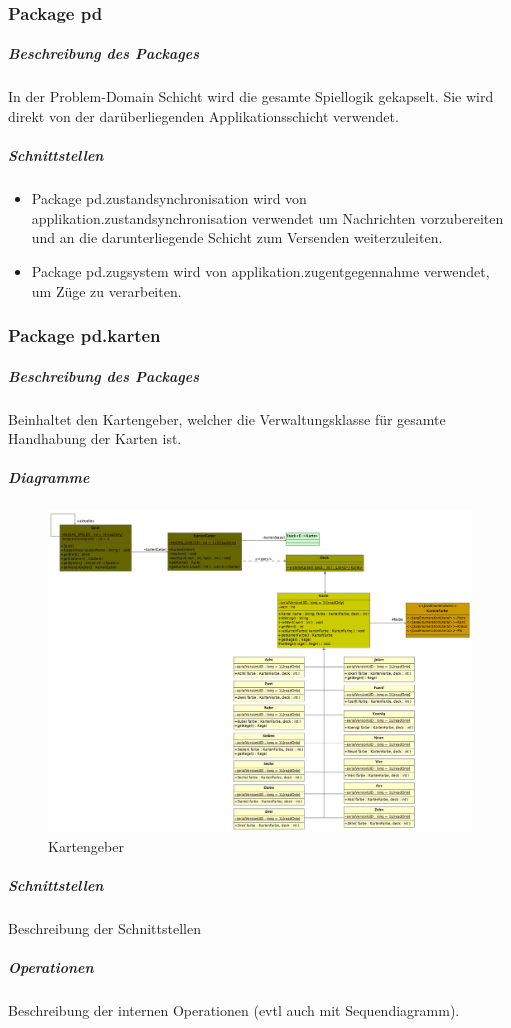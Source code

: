 \documentclass[a4paper,12pt,halfparskip,DIV14]{scrartcl}
\begin{document}
\subsubsection{Package pd} %
\label{ssub:package_pd}
\subparagraph{Beschreibung des Packages} %
\label{ssub:beschreibung_des_packages}
In der Problem-Domain Schicht wird die gesamte Spiellogik gekapselt. Sie wird direkt von der darüberliegenden Applikationsschicht verwendet.
\subparagraph{Schnittstellen} %
\label{ssub:schnittstellen}
\begin{itemize}
	\item Package pd.zustandsynchronisation wird von applikation.zustandsynchronisation verwendet um Nachrichten vorzubereiten und an die darunterliegende Schicht zum Versenden weiterzuleiten.
	\item Package pd.zugsystem wird von applikation.zugentgegennahme verwendet, um Züge zu verarbeiten.
\end{itemize}

\newpage
\subsubsection{Package pd.karten} %
\label{ssub:package_pd_karten}
\subparagraph{Beschreibung des Packages} %
\label{ssub:beschreibung_des_packages}
Beinhaltet den Kartengeber, welcher die Verwaltungsklasse für gesamte Handhabung der Karten ist.
\subparagraph{Diagramme} %
\label{ssub:diagramme}
\begin{figure}
	[htp] \centering 
	\includegraphics[width=1\textwidth]{pd_kartengeber.png} \caption{Kartengeber}\label{fig:pd_kartengeber.png} 
\end{figure}
\subparagraph{Schnittstellen} %
\label{ssub:schnittstellen}
Beschreibung der Schnittstellen
\subparagraph{Operationen} %
\label{ssub:operationen}
Beschreibung der internen Operationen (evtl auch mit Sequendiagramm).
\end{document}
